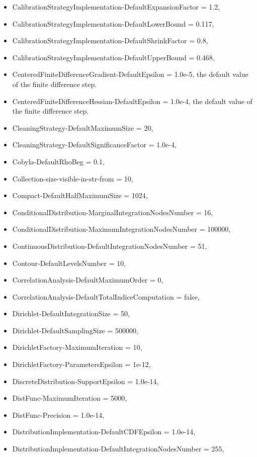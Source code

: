 \begin{itemize}
\item
  CalibrationStrategyImplementation-DefaultExpansionFactor = 1.2,
\item
  CalibrationStrategyImplementation-DefaultLowerBound = 0.117,
\item
  CalibrationStrategyImplementation-DefaultShrinkFactor = 0.8,
\item
  CalibrationStrategyImplementation-DefaultUpperBound = 0.468,
\item
  CenteredFiniteDifferenceGradient-DefaultEpsilon = 1.0e-5,
  the default value of the finite difference step.
\item
  CenteredFiniteDifferenceHessian-DefaultEpsilon = 1.0e-4,
  the default value of the finite difference step.
\item
  CleaningStrategy-DefaultMaximumSize = 20,
\item
  CleaningStrategy-DefaultSignificanceFactor = 1.0e-4,
\item
  Cobyla-DefaultRhoBeg = 0.1,
\item
  Collection-size-visible-in-str-from = 10,
\item
  Compact-DefaultHalfMaximumSize = 1024,
\item
  ConditionalDistribution-MarginalIntegrationNodesNumber = 16,
\item
  ConditionalDistribution-MaximumIntegrationNodesNumber = 100000,
\item
  ContinuousDistribution-DefaultIntegrationNodesNumber = 51,
\item
  Contour-DefaultLevelsNumber = 10,
\item
  CorrelationAnalysis-DefaultMaximumOrder = 0,
\item
  CorrelationAnalysis-DefaultTotalIndiceComputation = false,
\item
  Dirichlet-DefaultIntegrationSize = 50,
\item
  Dirichlet-DefaultSamplingSize = 500000,
\item
  DirichletFactory-MaximumIteration = 10,
\item
  DirichletFactory-ParametersEpsilon = 1e-12,
\item
  DiscreteDistribution-SupportEpsilon = 1.0e-14,
\item
  DistFunc-MaximumIteration = 5000,
\item
  DistFunc-Precision = 1.0e-14,
\item
  DistributionImplementation-DefaultCDFEpsilon = 1.0e-14,
\item
  DistributionImplementation-DefaultIntegrationNodesNumber = 255,

\end{itemize}
